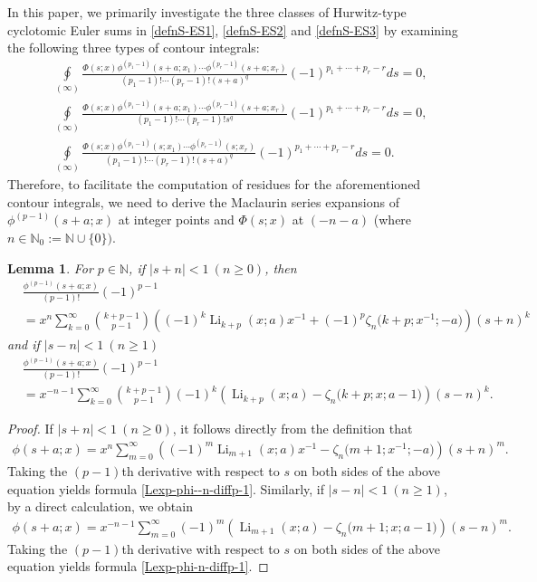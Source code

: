 \documentclass[11pt]{article}
\DeclareMathOperator{\Li}{Li}
\def\N{\mathbb{N}}
\theoremstyle{plain}
\newtheorem{lem}[thm]{Lemma}
\theoremstyle{definition}
\begin{document}
In this paper, we primarily investigate the three classes of Hurwitz-type cyclotomic Euler sums in \eqref{defnS-ES1}, \eqref{defnS-ES2} and \eqref{defnS-ES3} by examining the following three types of contour integrals:
\begin{align*}
&\oint\limits_{\left( \infty  \right)} \frac{\Phi(s;x)\phi^{(p_1-1)}(s+a;x_1)\cdots\phi^{(p_r-1)}(s+a;x_r)}{(p_1-1)!\cdots (p_r-1)!(s+a)^q}(-1)^{p_1+\cdots+p_r-r} ds=0,\\
&\oint\limits_{\left( \infty  \right)} \frac{\Phi(s;x)\phi^{(p_1-1)}(s+a;x_1)\cdots\phi^{(p_r-1)}(s+a;x_r)}{(p_1-1)!\cdots (p_r-1)!s^q}(-1)^{p_1+\cdots+p_r-r} ds=0,\\
&\oint\limits_{\left( \infty  \right)} \frac{\Phi(s;x)\phi^{(p_1-1)}(s;x_1)\cdots\phi^{(p_r-1)}(s;x_r)}{(p_1-1)!\cdots (p_r-1)!(s+a)^q}(-1)^{p_1+\cdots+p_r-r} ds=0.
\end{align*}
Therefore, to facilitate the computation of residues for the aforementioned contour integrals, we need to derive the Maclaurin series expansions of $\phi^{(p-1)}(s+a;x)$ at integer points and $\Phi(s;x)$ at $(-n - a)$ (where $n\in \N_0:=\N\cup \{0\})$.
\begin{lem}\label{lem-extend-xuzhou-one} For $p\in \N$, if $|s+n|<1\ (n\geq 0)$, then
\begin{align}\label{Lexp-phi--n-diffp-1}
&\frac{\phi^{(p-1)}(s+a;x)}{(p-1)!} (-1)^{p-1}\nonumber\\
&=x^n\sum_{k=0}^\infty \binom{k+p-1}{p-1} \left((-1)^k \Li_{k+p}(x;a)x^{-1}+(-1)^p \zeta_n\Big(k+p;x^{-1};-a\Big)\right)(s+n)^k
\end{align}
and if $|s-n|<1\ (n\geq 1)$
\begin{align}\label{Lexp-phi-n-diffp-1}
&\frac{\phi^{(p-1)}(s+a;x)}{(p-1)!} (-1)^{p-1}\nonumber\\
&=x^{-n-1}\sum_{k=0}^\infty \binom{k+p-1}{p-1} (-1)^k  \left( \Li_{k+p}(x;a)-\zeta_{n}\Big(k+p;x;a-1\Big)\right)(s-n)^k.
\end{align}
\end{lem}
\begin{proof}
If $|s+n|<1\ (n\geq 0)$, it follows directly from the definition that
\begin{align*}
\phi(s+a;x)=x^n \sum_{m=0}^\infty \left((-1)^m \Li_{m+1}(x;a)x^{-1}-\zeta_n\Big(m+1;x^{-1};-a\Big) \right)(s+n)^m.
\end{align*}
Taking the $(p-1)$th derivative with respect to $s$ on both sides of the above equation yields formula \eqref{Lexp-phi--n-diffp-1}. Similarly, if $|s-n|<1\ (n\geq 1)$, by a direct calculation, we obtain
\begin{align*}
\phi(s+a;x)=x^{-n-1} \sum_{m=0}^\infty (-1)^m \left( \Li_{m+1}(x;a)-\zeta_n\Big(m+1;x;a-1\Big) \right)(s-n)^m.
\end{align*}
Taking the $(p-1)$th derivative with respect to $s$ on both sides of the above equation yields formula \eqref{Lexp-phi-n-diffp-1}.
\end{proof}
\end{document}
